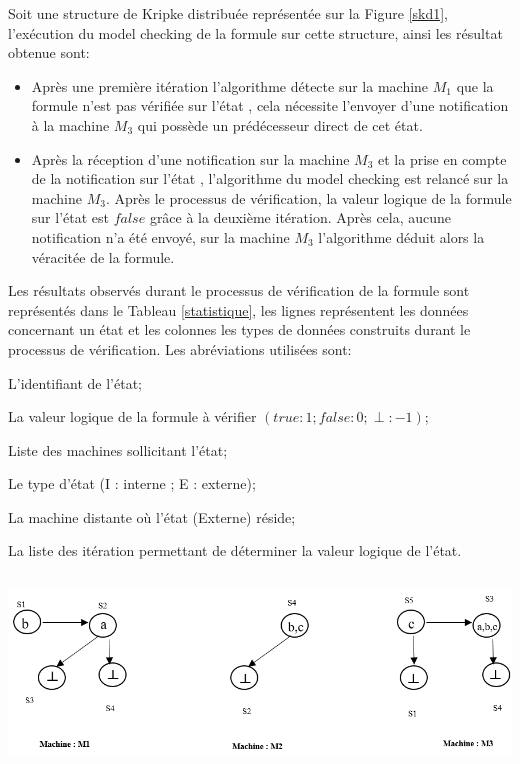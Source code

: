 \begin{Exemple}
   Soit une structure de Kripke distribuée représentée sur la Figure \ref{skd1}, l'exécution du model checking de la formule  sur cette structure, ainsi les résultat obtenue sont:
   \begin{itemize}
   	\item Après une première itération l'algorithme détecte sur la machine $M_1$ que la formule n’est pas vérifiée sur l’état , cela nécessite l'envoyer d'une notification à la machine $M_3$ qui possède un prédécesseur direct de cet état.
   	\item Après la réception d'une notification sur la machine $M_3$ et la prise en compte de la notification sur l'état , l'algorithme du model checking est relancé sur la machine $M_3$. Après le processus de vérification, la valeur logique de la formule sur l’état  est $false$ grâce à la deuxième itération. Après cela, aucune notification n'a été envoyé, sur la machine $M_3$ l'algorithme déduit alors la véracitée de la formule.
   \end{itemize}    
Les résultats observés durant le processus de vérification de la formule  sont représentés dans le Tableau \ref{statistique}, les lignes représentent les données concernant un état et les colonnes les types de données construits durant le processus de vérification. Les abréviations utilisées sont:
\begin{description}[,leftmargin=2cm,labelindent=1em]
	\item[Id   :] L'identifiant de l’état;
	\item[VL   :] La valeur logique de la formule à vérifier $(true : 1 ; false : 0 ; \perp : -1)$;
	\item [Sub :] Liste des machines sollicitant l'état;
	\item[T    :] Le type d’état (I : interne ; E : externe);
	\item[Site :] La machine distante o\`{u} l'état (Externe) réside;
	\item[I    :] La liste des itération permettant de déterminer la valeur logique de l'état.	
\end{description}
   \centering
	\includegraphics[height=2in]{img/skd1.png}	
	\label{skd1}
\end{Exemple}

